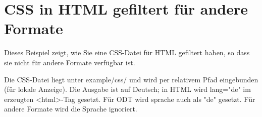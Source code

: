 \documentclass[a5paper]{report}
\begin{document}
\chapter{CSS in HTML gefiltert für andere Formate}

Dieses Beispiel zeigt, wie Sie eine CSS-Datei für HTML gefiltert haben, so dass sie nicht für andere Formate verfügbar ist.

Die CSS-Datei liegt unter example/css/ und wird per relativem Pfad eingebunden (für lokale Anzeige). Die Ausgabe ist auf Deutsch; in HTML wird lang="de" im erzeugten \textless{}html\textgreater{}-Tag gesetzt. Für ODT wird sprache auch als "de" gesetzt. Für andere Formate wird die Sprache ignoriert.
\end{document}
